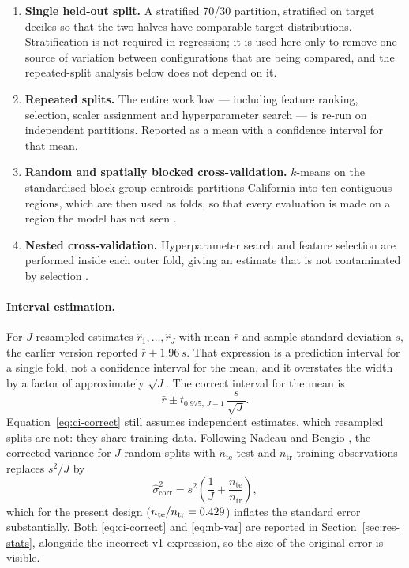 \documentclass[pdflatex,sn-mathphys-num]{sn-jnl}
\begin{document}
\begin{enumerate}
\item \textbf{Single held-out split.} A stratified 70/30 partition, stratified on target deciles so that the two halves have comparable target distributions. Stratification is not required in regression; it is used here only to remove one source of variation between configurations that are being compared, and the repeated-split analysis below does not depend on it.
\item \textbf{Repeated splits.} The entire workflow --- including feature ranking, selection, scaler assignment and hyperparameter search --- is re-run on \StatSplits{} independent partitions. Reported as a mean with a confidence interval for that mean.
\item \textbf{Random and spatially blocked cross-validation.} $k$-means on the standardised block-group centroids partitions California into ten contiguous regions, which are then used as folds, so that every evaluation is made on a region the model has not seen \cite{roberts2017}.
\item \textbf{Nested cross-validation.} Hyperparameter search and feature selection are performed inside each outer fold, giving an estimate that is not contaminated by selection \cite{varma2006,cawley2010}.
\end{enumerate}

\paragraph{Interval estimation.} For $J$ resampled estimates $\hat{r}_1, \dots, \hat{r}_J$ with mean $\bar{r}$ and sample standard deviation $s$, the earlier version reported $\bar{r} \pm 1.96\,s$. That expression is a prediction interval for a single fold, not a confidence interval for the mean, and it overstates the width by a factor of approximately $\sqrt{J}$. The correct interval for the mean is
\begin{equation}
\bar{r} \pm t_{0.975,\,J-1} \, \frac{s}{\sqrt{J}} .
\label{eq:ci-correct}
\end{equation}
Equation~\eqref{eq:ci-correct} still assumes independent estimates, which resampled splits are not: they share training data. Following Nadeau and Bengio \cite{nadeau2003}, the corrected variance for $J$ random splits with $n_{\text{te}}$ test and $n_{\text{tr}}$ training observations replaces $s^2/J$ by
\begin{equation}
\hat{\sigma}^{2}_{\text{corr}} = s^{2}\left( \frac{1}{J} + \frac{n_{\text{te}}}{n_{\text{tr}}} \right),
\label{eq:nb-var}
\end{equation}
which for the present design ($n_{\text{te}}/n_{\text{tr}} = 0.429$) inflates the standard error substantially. Both \eqref{eq:ci-correct} and \eqref{eq:nb-var} are reported in Section~\ref{sec:res-stats}, alongside the incorrect v1 expression, so the size of the original error is visible.
\end{document}
